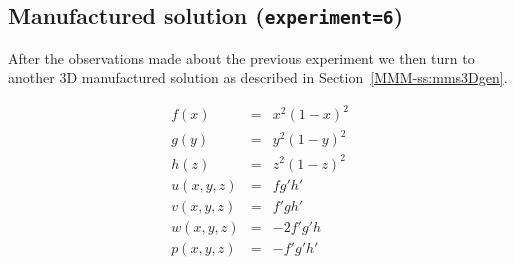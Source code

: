 \subsection*{Manufactured solution ({\tt experiment=6})}

After the observations made about the previous experiment we then turn to 
another 3D manufactured solution as described in Section~\ref{MMM-ss:mms3Dgen}.

\begin{eqnarray}
f(x) &=& x^2(1-x)^2 \\
g(y) &=& y^2(1-y)^2 \\
h(z) &=& z^2(1-z)^2 \\
u(x,y,z) &=& fg'h' \\
v(x,y,z) &=& f'gh'  \\
w(x,y,z) &=& -2f'g'h \\
p(x,y,z) &=& -f'g'h'
\end{eqnarray}


